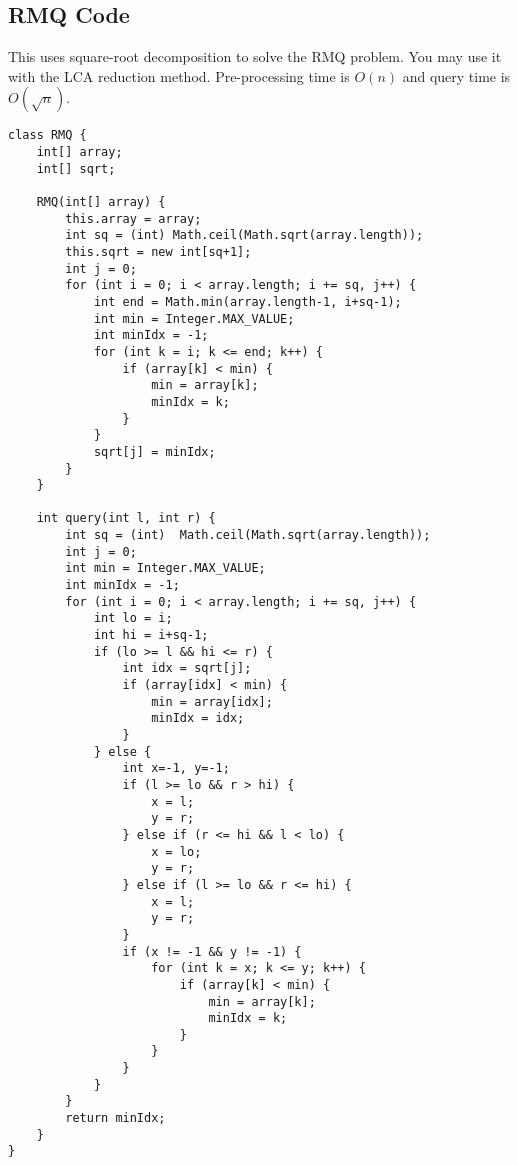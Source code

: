 \documentclass[11pt]{article}
\theoremstyle{plain}
\theoremstyle{definition}
\begin{document}
\subsection*{RMQ Code}
This uses square-root decomposition to solve the RMQ problem. You may use it with the LCA reduction method. Pre-processing time is $O(n)$ and query time is $O(\sqrt{n})$.
\begin {lstlisting}
class RMQ {
	int[] array;
	int[] sqrt;

	RMQ(int[] array) {
		this.array = array;
		int sq = (int) Math.ceil(Math.sqrt(array.length));
		this.sqrt = new int[sq+1];
		int j = 0;
		for (int i = 0; i < array.length; i += sq, j++) {
			int end = Math.min(array.length-1, i+sq-1);
			int min = Integer.MAX_VALUE;
			int minIdx = -1;
			for (int k = i; k <= end; k++) {
				if (array[k] < min) {
					min = array[k];
					minIdx = k;
				}
			}
			sqrt[j] = minIdx;
		}
	}

	int query(int l, int r) {
		int sq = (int)  Math.ceil(Math.sqrt(array.length));
		int j = 0;
		int min = Integer.MAX_VALUE;
		int minIdx = -1;
		for (int i = 0; i < array.length; i += sq, j++) {
			int lo = i;
			int hi = i+sq-1;
			if (lo >= l && hi <= r) {
				int idx = sqrt[j];
				if (array[idx] < min) {
					min = array[idx];
					minIdx = idx;
				}
			} else {
				int x=-1, y=-1;
				if (l >= lo && r > hi) {
					x = l;
					y = r;
				} else if (r <= hi && l < lo) {
					x = lo;
					y = r;
				} else if (l >= lo && r <= hi) {
					x = l;
					y = r;
				}
				if (x != -1 && y != -1) {
					for (int k = x; k <= y; k++) {
						if (array[k] < min) {
							min = array[k];
							minIdx = k;
						}
					}
				}
			}
		}
		return minIdx;
	}
}
\end{lstlisting}
\end{document}
